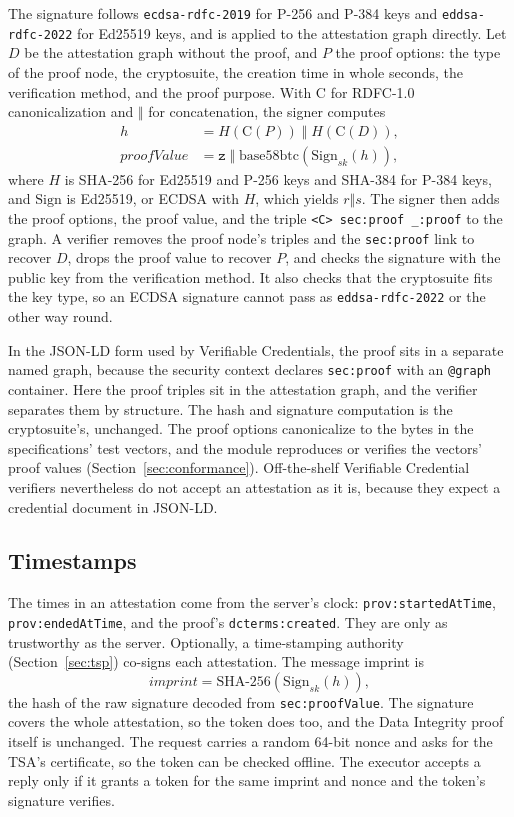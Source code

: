 \documentclass[11pt,a4paper]{article}
\newcommand{\code}[1]{\texttt{#1}}
\begin{document}
The signature follows \code{ecdsa-rdfc-2019} for P-256 and P-384 keys and
\code{eddsa-rdfc-2022} for Ed25519 keys, and is applied to the attestation graph directly.
Let $D$ be the attestation graph without the proof, and $P$ the proof options: the type of the
proof node, the cryptosuite, the creation time in whole seconds, the verification method, and
the proof purpose. With $\mathrm{C}$ for RDFC-1.0 canonicalization and $\Vert$ for
concatenation, the signer computes
\begin{align*}
  h &= H(\mathrm{C}(P)) \;\Vert\; H(\mathrm{C}(D)), \\
  \mathit{proofValue} &= \texttt{z} \;\Vert\; \mathrm{base58btc}(\mathrm{Sign}_{\mathit{sk}}(h)),
\end{align*}
where $H$ is SHA-256 for Ed25519 and P-256 keys and SHA-384 for P-384 keys, and
$\mathrm{Sign}$ is Ed25519, or ECDSA with $H$, which yields $r \Vert s$. The signer then adds
the proof options, the proof value, and the triple \code{<C> sec:proof \_:proof} to the
graph. A verifier removes the proof node's triples and the \code{sec:proof} link to
recover $D$, drops the proof value to recover $P$, and checks the signature with the public
key from the verification method. It also checks that the cryptosuite fits the key type, so
an ECDSA signature cannot pass as \code{eddsa-rdfc-2022} or the other way round.

In the JSON-LD form used by Verifiable Credentials, the proof sits in a separate named graph,
because the security context declares \code{sec:proof} with an \code{@graph} container. Here
the proof triples sit in the attestation graph, and the verifier separates them by structure.
The hash and signature computation is the cryptosuite's, unchanged. The proof options
canonicalize to the bytes in the specifications' test vectors, and the module reproduces or
verifies the vectors' proof values (Section~\ref{sec:conformance}). Off-the-shelf Verifiable
Credential verifiers nevertheless do not accept an attestation as it is, because they expect a
credential document in JSON-LD.

\subsection{Timestamps}
\label{sec:timestamps}

The times in an attestation come from the server's clock: \code{prov:startedAtTime},
\code{prov:endedAtTime}, and the proof's \code{dcterms:created}. They are only as trustworthy
as the server. Optionally, a time-stamping authority (Section~\ref{sec:tsp}) co-signs each
attestation. The message imprint is
\[
  \mathit{imprint} = \mathrm{SHA\text{-}256}(\mathrm{Sign}_{\mathit{sk}}(h)),
\]
the hash of the raw signature decoded from \code{sec:proofValue}. The signature covers the
whole attestation, so the token does too, and the Data Integrity proof itself is unchanged.
The request carries a random 64-bit nonce and asks for the TSA's certificate, so the token can
be checked offline. The executor accepts a reply only if it grants a token for the same
imprint and nonce and the token's signature verifies.
\end{document}
